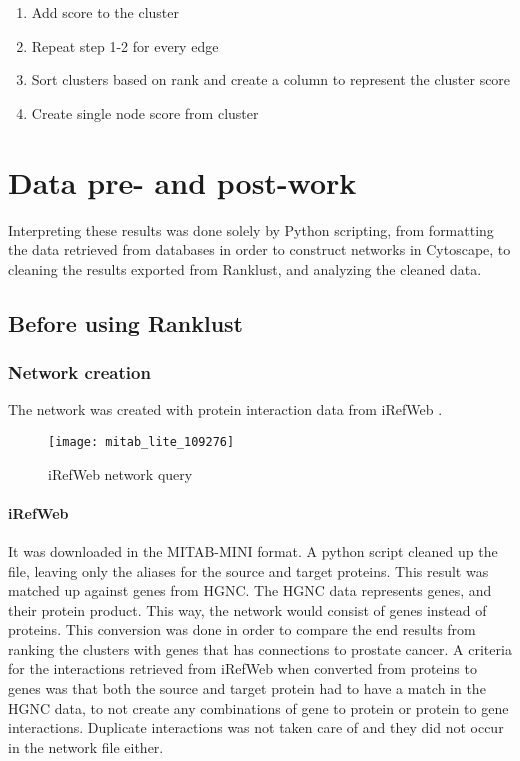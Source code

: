 \begin{enumerate}
    \item Add score to the cluster
    \item Repeat step 1-2 for every edge
    \item Sort clusters based on rank and create a column to represent the
        cluster score
    \item Create single node score from cluster
\end{enumerate}


\chapter{Data pre- and post-work}
Interpreting these results was done solely by Python scripting, from formatting
the data retrieved from databases in order to construct networks in Cytoscape,
to cleaning the results exported from Ranklust, and analyzing the cleaned data. 

\section{Before using Ranklust}
\subsection{Network creation}
The network was created with protein interaction data from iRefWeb
\cite{irefweb}. 

\begin{figure}[H]
    \centering
    \caption{iRefWeb network query}
    \label{fig:irefweb}
    \texttt{[image: mitab\_lite\_109276]}
\end{figure}

\subsubsection{iRefWeb}
It was downloaded in the MITAB-MINI format. A python script cleaned up the file,
leaving only the aliases for the source and target proteins. This result was
matched up against genes from HGNC. The HGNC data represents genes, and their
protein product. This way, the network would consist of genes instead of
proteins. This conversion was done in order to compare the end results from
ranking the clusters with genes that has connections to prostate cancer.
A criteria for the interactions retrieved from iRefWeb when converted from
proteins to genes was that both the source and target protein had to have
a match in the HGNC data, to not create any combinations of gene to protein or
protein to gene interactions. Duplicate interactions was not taken care of and
they did not occur in the network file either.

